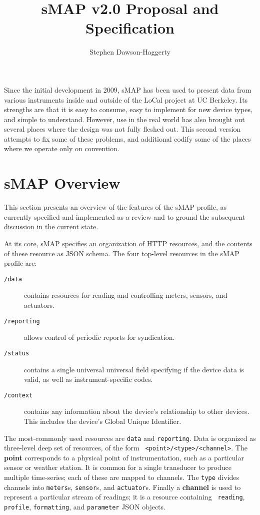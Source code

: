 \documentclass[10pt,letterpaper]{article}
\newcommand{\smap}{sMAP}
\newcommand{\smapversion}{2.0}
\begin{document}
\lstset{language=Java}
\title{sMAP v\smapversion{} Proposal and Specification}
\author{Stephen Dawson-Haggerty}
\maketitle

Since the initial development in 2009, sMAP has been used to present data from
various instruments inside and outside of the LoCal project at UC Berkeley.
Its strengths are that it is easy to consume, easy to implement for
new device types, and simple to understand.  However, use in the real world
has also brought out several places where the design was not fully fleshed
out.  This second version attempts to fix some of these problems, and
additional codify some of the places where we operate only on convention.

\setcounter{tocdepth}{2}
\tableofcontents

\section{sMAP Overview}

This section presents an overview of the features of the sMAP profile, as
currently specified and implemented as a review and to ground the subsequent
discussion in the current state.

At its core, sMAP specifies an organization of HTTP resources, and the
contents of these resource as JSON schema.  The four top-level resources in the \smap{} profile are:
\begin{description}
  \item[{\tt /data}] contains resources for reading and controlling meters,
    sensors, and actuators.
  \item[{\tt /reporting}] allows control of periodic reports for syndication.
  \item[{\tt /status}] contains a single universal universal field specifying
    if the device data is valid, as well as instrument-specific codes.
  \item[{\tt /context}] contains any information about the device's
    relationship to other devices.  This includes the device's Global Unique
    Identifier.
\end{description}

The most-commonly used resources are {\tt data} and {\tt reporting}.  Data is
organized as three-level deep set of resources, of the form {\tt
  <point>/<type>/<channel>}.  The {\bf point} corresponds to a physical point
of instrumentation, such as a particular sensor or weather station.  It is
common for a single transducer to produce multiple time-series; each of these
are mapped to channels.  The {\tt type} divides channels into {\tt meters}s,
{\tt sensor}s, and {\tt actuator}s.  Finally a {\bf channel} is used to
represent a particular stream of readings; it is a resource containing {\tt
  reading}, {\tt profile}, {\tt formatting}, and {\tt parameter} JSON objects.
\end{document}
